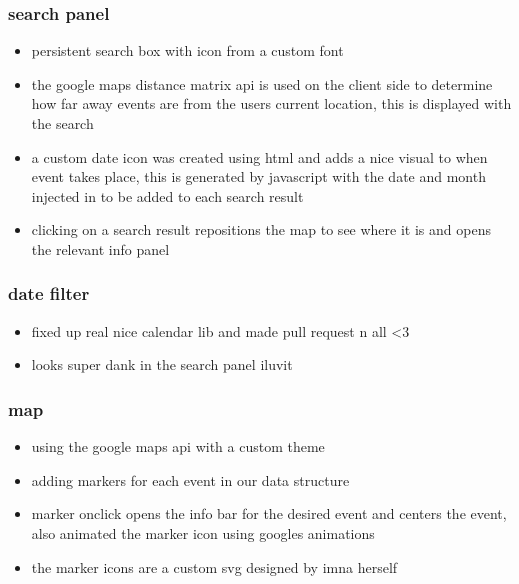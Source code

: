 \documentclass[10pt]{article}
\begin{document}
            \subsubsection{search panel}
                \begin{itemize}
                    \item persistent search box with icon from a custom font
                    \item the google maps distance matrix api is used on the client side to determine how far away events are from the users current location, this is displayed with the search
                    \item a custom date icon was created using html and adds a nice visual to when event takes place, this is generated by javascript with the date and month injected in to be added to each search result
                    \item clicking on a search result repositions the map to see where it is and opens the relevant info panel
                \end{itemize}

            \subsubsection{date filter}
                    \begin{itemize}
                    \item fixed up real nice calendar lib and made pull request n all \textless3
                    \item looks super dank in the search panel iluvit
                \end{itemize}

            \subsubsection{map}
                \begin{itemize}
                    \item using the google maps api with a custom theme
                    \item adding markers for each event in our data structure
                    \item marker onclick opens the info bar for the desired event and centers the event, also animated the marker icon using googles animations
                    \item the marker icons are a custom svg designed by imna herself
                \end{itemize}
\end{document}
